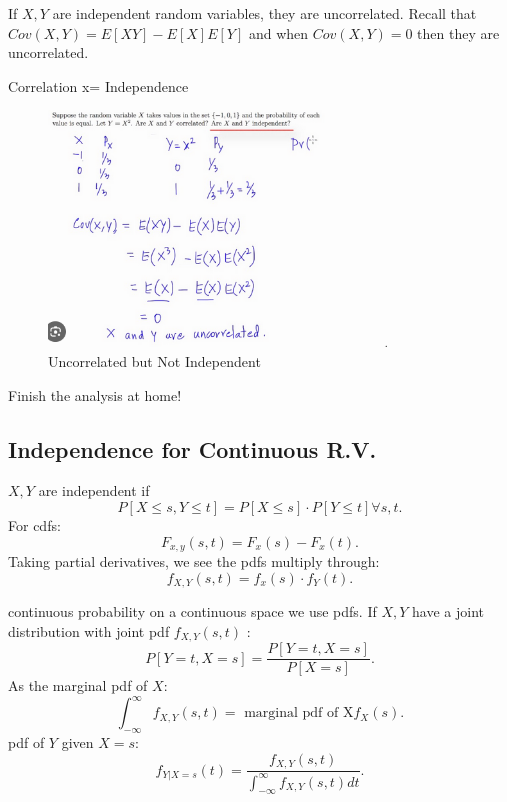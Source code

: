 \documentclass[a4paper]{article}
\begin{document}
\begin{corollary}
  If $X,Y$ are independent random variables, they are uncorrelated. Recall that $Cov(X,Y) = E[XY] - E[X] E[Y]$
  and when $Cov(X,Y) = 0$ then they are uncorrelated.
\end{corollary}

\begin{note}{Correlation x= Independence} \\

\begin{figure}[h]
  \centering
  \includegraphics[width=0.8\textwidth]{assets/uncorrelated_not_independent_ex.png}
  \caption{Uncorrelated but Not Independent}
  \label{fig:uncorrelated_not_independent_ex}
\end{figure}
  Finish the analysis at home!
\end{note}

\subsection{Independence for Continuous R.V.}
\begin{definition}
  $X,Y$ are independent if 
   \[
     P[X \leq s, Y \leq t] = P[X \leq s] \cdot P[Y \leq t] \forall s,t
  .\] 
  For cdfs:
  \[
  F_{x,y} (s,t) = F_x(s) - F_x(t)
  .\] 
  Taking partial derivatives, we see the pdfs multiply through:
  \[
  f_{X,Y}(s,t)= f_x(s) \cdot f_Y(t) 
  .\] 
\end{definition}

\begin{definition}
  continuous probability on a continuous space we use pdfs. If $X,Y$ have a joint distribution
  with joint pdf  $f_{X,Y}(s,t)$ :
  \[
    P[Y=t, X=s] = \frac{P[Y=t,X=s]}{P[X=s]}
  .\] 
  As the marginal pdf of $X$:
  \[
    \int_{-\infty}^{\infty} f_{X,Y}(s,t) = \text{ marginal pdf of X} f_X(s)  
  .\] 
  pdf of $Y$ given  $X=s$:
   \[
  f_{Y|X=s} (t) = \frac{f_{X,Y}(s,t)}{\int_{-\infty}^{\infty} f_{X,Y} (s,t) dt}
  .\] 
\end{definition}
\end{document}
